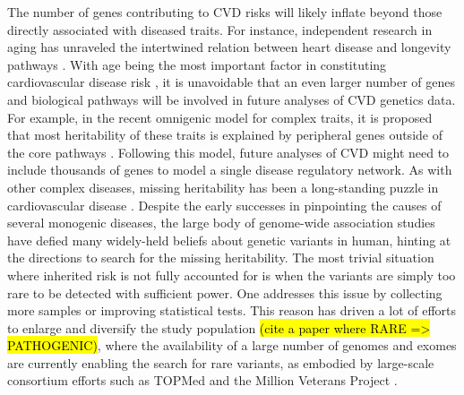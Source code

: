 \documentclass[letter]{bioinfo}
\newcommand{\comment}[1]{\textcolor{red}{#1}}
\begin{document}
	The number of genes contributing to CVD risks will likely inflate beyond those directly associated with diseased traits.  For instance, independent research in aging has unraveled the intertwined relation between heart disease and longevity pathways \citep{North:2012:Intersection}.  With age being the most important factor in constituting cardiovascular disease risk \citep{Steenman:2017:Cardiac}, it is unavoidable that an even larger number of genes and biological pathways will be involved in future analyses of CVD genetics data.  For example, in the recent omnigenic model for complex traits, it is proposed that most heritability of these traits is explained by peripheral genes outside of the core pathways \citep{Boyle:2017:Expanded}. Following this model, future analyses of CVD might need to include thousands of genes to model a single disease regulatory network.  As with other complex diseases, missing heritability has been a long-standing puzzle in cardiovascular disease \citep{Manolio:2009:Finding}. Despite the early successes in pinpointing the causes of several monogenic diseases, the large body of genome-wide association studies have defied many widely-held beliefs about genetic variants in human, hinting at the directions to search for the missing heritability.  The most trivial situation where inherited risk is not fully accounted for is when the variants are simply too rare to be detected with sufficient power. One addresses this issue by collecting more samples or improving statistical tests.  This reason has driven a lot of efforts to enlarge and diversify the study population \hl{(cite a paper where RARE => PATHOGENIC)}, where the availability of a large number of genomes and exomes are currently enabling the search for rare variants, as embodied by large-scale consortium efforts such as TOPMed \citep{NHLBI:2014:TransOmics} and the Million Veterans Project \citep{Gaziano:2016:Million}.    
	
	
	
	
\end{document}
